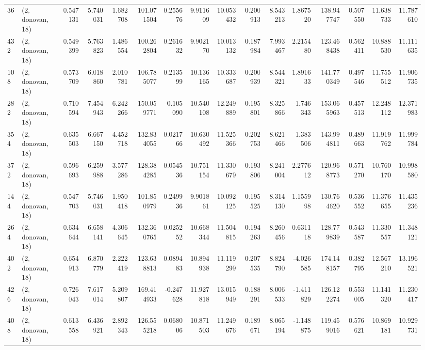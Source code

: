 \begin{tabular}{llrrrrrrrrrrrrrr}
36  &  (2, donovan, 18) &   0.547131 &   5.740031 &   1.682708 &   101.071504 &   0.255676 &   9.911609 &  10.053432 &  0.200913 &   8.543213 &   1.867520 &   138.947747 &   0.507550 &  11.638733 &  11.787610 \\
432 &  (2, donovan, 18) &   0.549399 &   5.763823 &   1.486554 &   100.262804 &   0.261632 &   9.902170 &  10.013132 &  0.187984 &   7.993467 &   2.215480 &   123.468438 &   0.562411 &  10.888530 &  11.111635 \\
108 &  (2, donovan, 18) &   0.573709 &   6.018860 &   2.010781 &   106.785077 &   0.213599 &  10.136165 &  10.333687 &  0.200939 &   8.544321 &   1.891633 &   141.770349 &   0.497546 &  11.755512 &  11.906735 \\
282 &  (2, donovan, 18) &   0.710594 &   7.454943 &   6.242266 &   150.059771 &  -0.105090 &  10.540108 &  12.249889 &  0.195801 &   8.325866 &  -1.746343 &   153.065963 &   0.457513 &  12.248112 &  12.371983 \\
354 &  (2, donovan, 18) &   0.635503 &   6.667150 &   4.452718 &   132.834055 &   0.021766 &  10.630492 &  11.525366 &  0.202753 &   8.621466 &  -1.383506 &   143.994811 &   0.489663 &  11.919762 &  11.999784 \\
372 &  (2, donovan, 18) &   0.596693 &   6.259988 &   3.577286 &   128.384285 &   0.054536 &  10.751154 &  11.330679 &  0.193806 &   8.241004 &   2.277612 &   120.968773 &   0.571270 &  10.760170 &  10.998580 \\
144 &  (2, donovan, 18) &   0.547703 &   5.746031 &   1.950418 &   101.850979 &   0.249936 &   9.901861 &  10.092125 &  0.195525 &   8.314130 &   1.155998 &   130.764620 &   0.536552 &  11.376655 &  11.435236 \\
264 &  (2, donovan, 18) &   0.634644 &   6.658141 &   4.306645 &   132.360765 &   0.025252 &  10.668344 &  11.504815 &  0.194263 &   8.260456 &   0.631118 &   128.779839 &   0.543587 &  11.330557 &  11.348121 \\
402 &  (2, donovan, 18) &   0.654913 &   6.870779 &   2.222419 &   123.638813 &   0.089483 &  10.894938 &  11.119299 &  0.207535 &   8.824790 &  -4.026585 &   174.148157 &   0.382795 &  12.567210 &  13.196521 \\
426 &  (2, donovan, 18) &   0.726043 &   7.617014 &   5.209807 &   169.414933 &  -0.247628 &  11.927818 &  13.015949 &  0.188291 &   8.006533 &  -1.411829 &   126.122274 &   0.553005 &  11.141320 &  11.230417 \\
408 &  (2, donovan, 18) &   0.613558 &   6.436921 &   2.892343 &   126.555218 &   0.068006 &  10.871503 &  11.249676 &  0.189671 &   8.065194 &  -1.148875 &   119.459016 &   0.576621 &  10.869181 &  10.929731 \\

\end{tabular}
